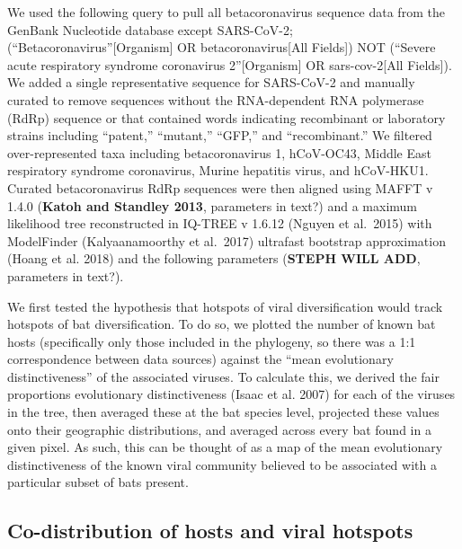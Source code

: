 \documentclass[10pt,oneside]{article}
\begin{document}
We used the following query to pull all betacoronavirus sequence data
from the GenBank Nucleotide database except SARS-CoV-2;
(``Betacoronavirus''{[}Organism{]} OR betacoronavirus{[}All Fields{]})
NOT (``Severe acute respiratory syndrome coronavirus 2''{[}Organism{]}
OR sars-cov-2{[}All Fields{]}). We added a single representative
sequence for SARS-CoV-2 and manually curated to remove sequences without
the RNA-dependent RNA polymerase (RdRp) sequence or that contained words
indicating recombinant or laboratory strains including ``patent,''
``mutant,'' ``GFP,'' and ``recombinant.'' We filtered over-represented
taxa including betacoronavirus 1, hCoV-OC43, Middle East respiratory
syndrome coronavirus, Murine hepatitis virus, and hCoV-HKU1. Curated
betacoronavirus RdRp sequences were then aligned using MAFFT v 1.4.0
(\textbf{Katoh and Standley 2013}, parameters in text?) and a maximum
likelihood tree reconstructed in IQ-TREE v 1.6.12 (Nguyen et al.~2015)
with ModelFinder (Kalyaanamoorthy et al.~2017) ultrafast bootstrap
approximation (Hoang et al. 2018) and the following parameters
(\textbf{STEPH WILL ADD}, parameters in text?).

We first tested the hypothesis that hotspots of viral diversification
would track hotspots of bat diversification. To do so, we plotted the
number of known bat hosts (specifically only those included in the
phylogeny, so there was a 1:1 correspondence between data sources)
against the ``mean evolutionary distinctiveness'' of the associated
viruses. To calculate this, we derived the fair proportions evolutionary
distinctiveness (Isaac et al. 2007) for each of the viruses in the tree,
then averaged these at the bat species level, projected these values
onto their geographic distributions, and averaged across every bat found
in a given pixel. As such, this can be thought of as a map of the mean
evolutionary distinctiveness of the known viral community believed to be
associated with a particular subset of bats present.

\hypertarget{co-distribution-of-hosts-and-viral-hotspots}{%
\subsection{Co-distribution of hosts and viral
hotspots}\label{co-distribution-of-hosts-and-viral-hotspots}}
\end{document}
